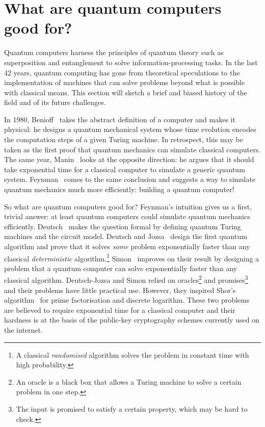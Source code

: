 
\section*{What are quantum computers good for?}


Quantum computers harness the principles of quantum theory such as superposition and entanglement to solve information-processing tasks.
In the last 42 years, quantum computing has gone from theoretical speculations to the implementation of machines that can solve problems beyond what is possible with classical means.
This section will sketch a brief and biased history of the field and of its future challenges.

In 1980, Benioff~\cite{Benioff80} takes the abstract definition of a computer and makes it physical: he designs a quantum mechanical system whose time evolution encodes the computation steps of a given Turing machine.
In retrospect, this may be taken as the first proof that quantum mechanics can simulate classical computers.
The same year, Manin~\cite{Manin80} looks at the opposite direction: he argues that it should take exponential time for a classical computer to simulate a generic quantum system.
Feynman~\cite{Feynman82,Feynman85} comes to the same conclusion and suggests a way to simulate quantum mechanics much more efficiently: building a quantum computer!

So what are quantum computers good for? Feynman's intuition gives us a first, trivial answer: at least quantum computers could simulate quantum mechanics efficiently. Deutsch~\cite{Deutsch85a} makes the question formal by defining quantum Turing machines and the circuit model.
Deutsch and Jozsa~\cite{DeutschJozsa92} design the first quantum algorithm and prove that it solves \emph{some} problem exponentially faster than any classical \emph{deterministic} algorithm.\footnote
{A classical \emph{randomised} algorithm solves the problem in constant time with high probability.}
Simon~\cite{Simon94} improves on their result by designing a problem that a quantum computer can solve exponentially faster than any classical algorithm.
Deutsch-Jozsa and Simon relied on oracles\footnote{An oracle is a black box that allows a Turing machine to solve a certain problem in one step.}
and promises\footnote{The input is promised to satisfy a certain property, which may be hard to check.} and their problems have little practical use.
However, they inspired Shor's algorithm~\cite{Shor94} for prime factorisation and discrete logarithm. These two problems are believed to require exponential time for a classical computer and their hardness is at the basis of the public-key cryptography schemes currently used on the internet.

